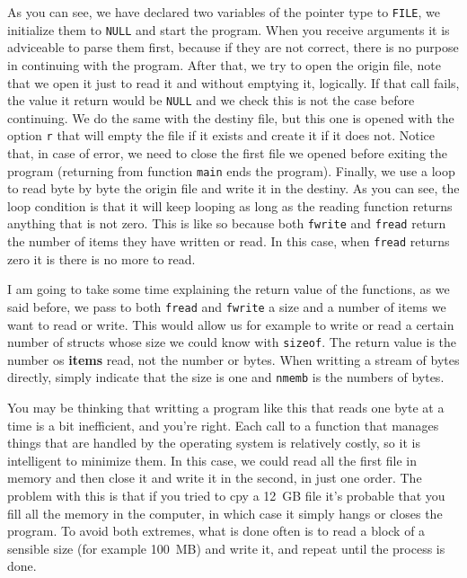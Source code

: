 \documentclass[a4paper]{article}
\begin{document}
As you can see, we have declared two variables of the pointer type to
\verb!FILE!, we initialize them to \verb"NULL" and start the program. When you
receive arguments it is adviceable to parse them first, because if they are not
correct, there is no purpose in continuing with the program. After that, we try
to open the origin file, note that we open it just to read it and without
emptying it, logically. If that call fails, the value it return would be
\verb!NULL! and we check this is not the case before continuing. We do the
same with the destiny
file, but this one is opened with the option \verb!r! that will empty the file
if it exists and create it if it does not.
Notice that, in case of error, we need to close the first file we
opened before exiting the program (returning from function \verb!main! ends the
program). Finally, we use a loop to read byte by byte the origin file and write
it in the destiny. As you can see, the loop condition is that it will keep
looping as long as the reading function returns anything that is not zero.
This is like so because both \verb!fwrite! and \verb!fread! return the number of
items they have written or read. In this case, when \verb!fread! returns zero it
is there is no more to read.

I am going to take some time explaining the return value of the functions, as
we said before, we pass to both \verb!fread! and \verb!fwrite! a size and a
number of items we want to read or write. This would allow us for example to
write or read a certain number of structs whose size we could know with
\verb!sizeof!. The return value is the number os \textbf{items} read, not the
number or bytes. When writting a stream of bytes directly, simply indicate that
the size is one and \verb!nmemb! is the numbers of bytes.

You may be thinking that writting a program like this that reads one byte at a
time is a bit inefficient, and you're right. Each call to a function that
manages things that are handled by the operating system is relatively costly,
so it is intelligent to minimize them. In this case, we could read all the
first file in memory and then close it and write it in the second, in just one
order. The problem with this is that if you tried to cpy a 12~GB file it's
probable that you fill all the memory in the computer, in which case it simply
hangs or closes the program. To avoid both extremes, what is done often is to
read a block of a sensible size (for example 100~MB) and write it, and repeat
until the process is done.
\end{document}
